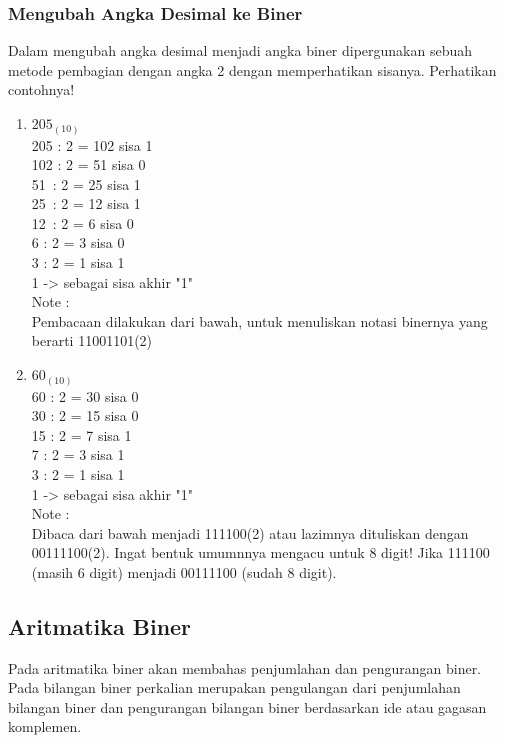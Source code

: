 \begin{enumerate}[label=(\alph*)]
\subsubsection {Mengubah Angka Desimal ke Biner} 

\qquad Dalam mengubah angka desimal menjadi angka biner dipergunakan sebuah metode pembagian dengan angka 2 dengan memperhatikan sisanya. 
Perhatikan contohnya! 
\begin{enumerate}
\item $205_{(10)}$\\
205 : 2 = 102 sisa 1\\ 
102 : 2 = 51 sisa 0 \\
51 \,: 2 = 25 sisa 1\\
25 \,: 2 = 12 sisa 1 \\
12 \,: 2 = 6 sisa 0 \\
6 \quad : 2 = 3 sisa 0 \\
3 \quad : 2 = 1 sisa 1 \\
1 -> sebagai sisa akhir "1"\\

Note :\\
Pembacaan dilakukan dari bawah, untuk menuliskan notasi binernya yang berarti 11001101(2) \\

\item $60_{(10)}$\\
60 : 2 = 30 sisa 0\\ 
30 : 2 = 15 sisa 0 \\
15 : 2 = 7 sisa 1 \\
7 \: : 2 = 3 sisa 1 \\
3 \: : 2 = 1 sisa 1 \\
1 -> sebagai sisa akhir "1"\\

Note :\\
Dibaca dari bawah menjadi 111100(2) atau lazimnya dituliskan dengan 00111100(2). Ingat bentuk umumnnya mengacu untuk 8 digit! Jika 111100 (masih 6 digit) menjadi 00111100 (sudah 8 digit).

\end{enumerate}

\subsection{Aritmatika Biner}

\qquad Pada aritmatika biner akan membahas penjumlahan dan pengurangan biner. Pada bilangan biner perkalian merupakan pengulangan dari penjumlahan bilangan biner dan pengurangan bilangan biner berdasarkan ide atau gagasan komplemen.


\end{enumerate}
